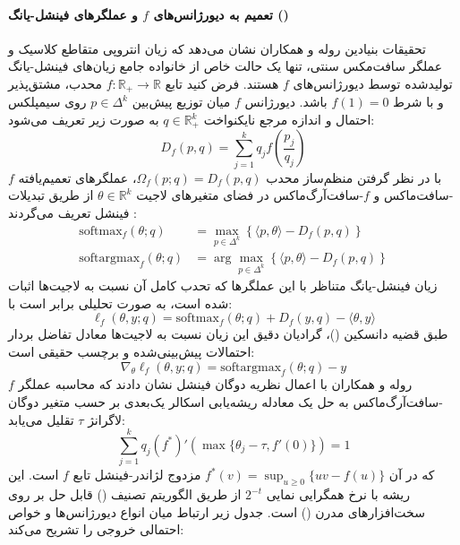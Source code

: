 \paragraph*{تعمیم به دیورژانس‌های $f$ و عملگرهای فینشل-یانگ ()}
تحقیقات بنیادین روله و همکاران \cite{roulet2025loss} نشان می‌دهد که زیان انتروپی متقاطع کلاسیک و عملگر سافت‌مکس سنتی، تنها یک حالت خاص از خانواده جامع زیان‌های فینشل-یانگ تولیدشده توسط دیورژانس‌های $f$ هستند. فرض کنید تابع $f: \mathbb{R}_+ \to \mathbb{R}$ محدب، مشتق‌پذیر و با شرط $f(1)=0$ باشد. دیورژانس $f$ میان توزیع پیش‌بین $p \in \Delta^k$ روی سیمپلکس احتمال و اندازه مرجع نایکنواخت $q \in \mathbb{R}_+^k$ به صورت زیر تعریف می‌شود:
\begin{equation}
    D_f(p, q) = \sum_{j=1}^k q_j f\left(\frac{p_j}{q_j}\right)
\end{equation}
با در نظر گرفتن منظم‌ساز محدب $\Omega_f(p; q) = D_f(p, q)$، عملگرهای تعمیم‌یافته $f$-سافت‌ماکس و $f$-سافت‌آرگ‌ماکس در فضای متغیرهای لاجیت $\theta \in \mathbb{R}^k$ از طریق تبدیلات فینشل تعریف می‌گردند \cite{roulet2025loss}:
\begin{align}
    \text{softmax}_f(\theta; q) &= \max_{p \in \Delta^k} \left\{ \langle p, \theta \rangle - D_f(p, q) \right\} \\
    \text{softargmax}_f(\theta; q) &= \arg\max_{p \in \Delta^k} \left\{ \langle p, \theta \rangle - D_f(p, q) \right\}
\end{align}
زیان فینشل-یانگ متناظر با این عملگرها که تحدب کامل آن نسبت به لاجیت‌ها اثبات شده است، به صورت تحلیلی برابر است با:
\begin{equation}
    \ell_f(\theta, y; q) = \text{softmax}_f(\theta; q) + D_f(y, q) - \langle \theta, y \rangle
\end{equation}
طبق قضیه دانسکین ()، گرادیان دقیق این زیان نسبت به لاجیت‌ها معادل تفاضل بردار احتمالات پیش‌بینی‌شده و برچسب حقیقی است:
\begin{equation}
    \nabla_\theta \ell_f(\theta, y; q) = \text{softargmax}_f(\theta; q) - y
\end{equation}
روله و همکاران \cite{roulet2025loss} با اعمال نظریه دوگان فینشل نشان دادند که محاسبه عملگر $f$-سافت‌آرگ‌ماکس به حل یک معادله ریشه‌یابی اسکالر یک‌بعدی بر حسب متغیر دوگان لاگرانژ $\tau$ تقلیل می‌یابد:
\begin{equation}
    \sum_{j=1}^k q_j (f^*)'\left( \max\{\theta_j - \tau, f'(0)\} \right) = 1
\end{equation}
که در آن $f^*(v) = \sup_{u \ge 0} \{uv - f(u)\}$ مزدوج لژاندر-فینشل تابع $f$ است. این ریشه با نرخ همگرایی نمایی $2^{-t}$ از طریق الگوریتم تصنیف () قابل حل بر روی سخت‌افزارهای مدرن () است. جدول زیر ارتباط میان انواع دیورژانس‌ها و خواص احتمالی خروجی را تشریح می‌کند:

